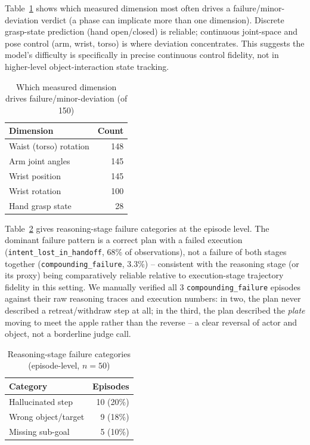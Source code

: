 \documentclass[conference]{IEEEtran}
\begin{document}
Table~\ref{tab:driving} shows which measured dimension most often drives a
failure/minor-deviation verdict (a phase can implicate more than one dimension).
Discrete grasp-state prediction (hand open/closed) is reliable; continuous joint-space
and pose control (arm, wrist, torso) is where deviation concentrates. This suggests the
model's difficulty is specifically in precise continuous control fidelity, not in
higher-level object-interaction state tracking.

\begin{table}[htbp]
\centering
\caption{Which measured dimension drives failure/minor-deviation (of 150)}
\label{tab:driving}
\begin{tabular}{@{}lr@{}}
\toprule
Dimension & Count \\
\midrule
Waist (torso) rotation & 148 \\
Arm joint angles & 145 \\
Wrist position & 145 \\
Wrist rotation & 100 \\
Hand grasp state & 28 \\
\bottomrule
\end{tabular}
\end{table}

Table~\ref{tab:reasoning} gives reasoning-stage failure categories at the episode level.
The dominant failure pattern is a correct plan with a failed execution
(\texttt{intent\_lost\_in\_handoff}, 68\% of observations), not a failure of both stages
together (\texttt{compounding\_failure}, 3.3\%) -- consistent with the reasoning stage
(or its proxy) being comparatively reliable relative to execution-stage trajectory
fidelity in this setting. We manually verified all 3 \texttt{compounding\_failure}
episodes against their raw reasoning traces and execution numbers: in two, the plan never
described a retreat/withdraw step at all; in the third, the plan described the
\emph{plate} moving to meet the apple rather than the reverse -- a clear reversal of
actor and object, not a borderline judge call.

\begin{table}[htbp]
\centering
\caption{Reasoning-stage failure categories (episode-level, $n=50$)}
\label{tab:reasoning}
\begin{tabular}{@{}lr@{}}
\toprule
Category & Episodes \\
\midrule
Hallucinated step & 10 (20\%) \\
Wrong object/target & 9 (18\%) \\
Missing sub-goal & 5 (10\%) \\
\bottomrule
\end{tabular}
\end{table}
\end{document}
